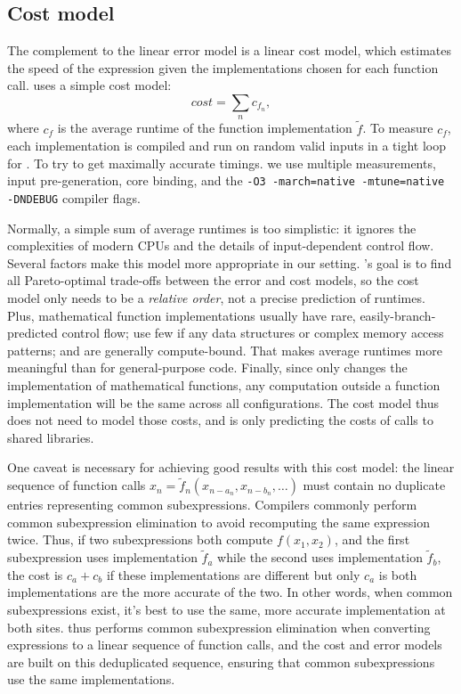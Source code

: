 \documentclass[paper.tex]{subfiles}
\begin{document}
\subsection{Cost model}

The complement to the linear error model is a linear cost model,
  which estimates the speed of the expression
  given the implementations chosen for each function call.
\name uses a simple cost model:
\[
\mathit{cost} = \sum_n c_{f_n},
\]
  where $c_f$ is the average runtime of the function implementation $\tilde{f}$.
To measure $c_f$, each implementation
  is compiled and run
  on \nTimingInputs random valid inputs
  in a tight loop for \nTimingElapsed.
To try to get maximally accurate timings.
  we use multiple measurements, input pre-generation, core binding,
  and the \texttt{-O3 -march=native -mtune=native -DNDEBUG} compiler flags.

Normally, a simple sum of average runtimes is too simplistic:
  it ignores the complexities of modern CPUs
  and the details of input-dependent control flow.
Several factors make this model more appropriate in our setting.
\name's goal is to find
  all Pareto-optimal trade-offs between the error and cost models,
  so the cost model only needs to be a \textit{relative order},
  not a precise prediction of runtimes.
Plus, mathematical function implementations usually
  have rare, easily-branch-predicted control flow;
  use few if any data structures or complex memory access patterns;
  and are generally compute-bound.
That makes average runtimes more meaningful
  than for general-purpose code.
Finally, since \name only changes the implementation of mathematical functions,
  any computation outside a function implementation
  will be the same across all configurations.
The cost model thus does not need to model those costs,
  and is only predicting the costs of calls to shared libraries.

One caveat is necessary for achieving good results with this cost model:
  the linear sequence of function calls $x_n = \tilde{f}_n(x_{n-a_n}, x_{n-b_n}, \ldots)$
  must contain no duplicate entries representing common subexpressions.
Compilers commonly perform common subexpression elimination
  to avoid recomputing the same expression twice.
Thus, if two subexpressions both compute $f(x_1, x_2)$,
  and the first subexpression uses implementation $\tilde{f}_a$
  while the second uses implementation $\tilde{f}_b$,
  the cost is $c_a + c_b$ if these implementations are different
  but only $c_a$ is both implementations are the more accurate of the two.
In other words, when common subexpressions exist,
  it's best to use the same, more accurate implementation at both sites.
\name thus performs common subexpression elimination
  when converting expressions to a linear sequence of function calls,
  and the cost and error models are built on this deduplicated sequence,
  ensuring that common subexpressions use the same implementations.
\end{document}
